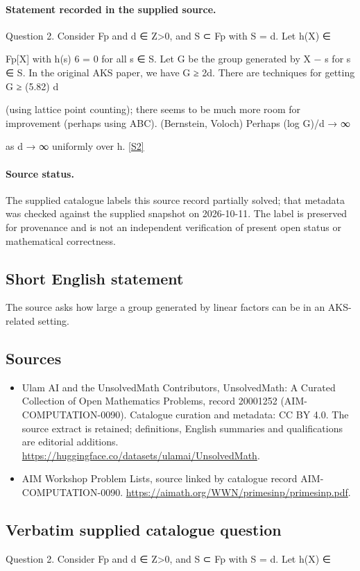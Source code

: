 \documentclass[11pt]{article}
\begin{document}
\paragraph{Statement recorded in the supplied source.}
Question 2. Consider Fp and d ∈ Z>0, and S ⊂ Fp with S = d. Let h(X) ∈

Fp[X] with h(s) 6 = 0 for all s ∈ S. Let G be the group generated by X − s for s ∈ S. In the original AKS paper, we have G ≥ 2d. There are techniques for getting G ≥ (5.82) d

(using lattice point counting); there seems to be much more room for improvement (perhaps using ABC). (Bernstein, Voloch) Perhaps (log G)/d → ∞

as d → ∞ uniformly over h. \href{https://aimath.org/WWN/primesinp/primesinp.pdf}{[S2]}
\paragraph{Source status.}
The supplied catalogue labels this source record partially solved; that metadata was checked against the supplied snapshot on 2026-10-11. The label is preserved for provenance and is not an independent verification of present open status or mathematical correctness.
\subsection{Short English statement}
The source asks how large a group generated by linear factors can be in an AKS-related setting.
\subsection{Sources}
\begin{itemize}
\item[S1] Ulam AI and the UnsolvedMath Contributors, UnsolvedMath: A Curated Collection of Open Mathematics Problems, record 20001252 (AIM-COMPUTATION-0090). Catalogue curation and metadata: CC BY 4.0. The source extract is retained; definitions, English summaries and qualifications are editorial additions.
\url{https://huggingface.co/datasets/ulamai/UnsolvedMath}.
\item[S2] AIM Workshop Problem Lists, source linked by catalogue record AIM-COMPUTATION-0090.
\url{https://aimath.org/WWN/primesinp/primesinp.pdf}.
\end{itemize}
\subsection{Verbatim supplied catalogue question}
Question 2. Consider Fp and d ∈ Z>0, and S ⊂ Fp with S = d. Let h(X) ∈
\end{document}
